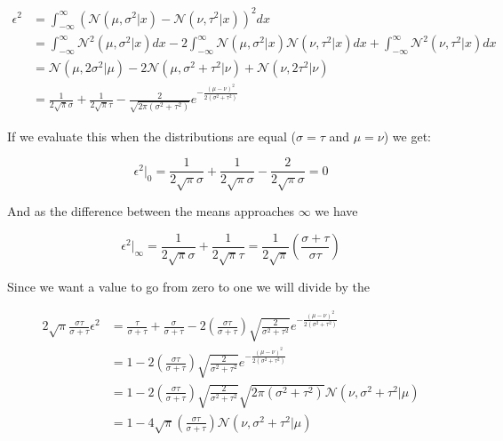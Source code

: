 \documentclass{article}
\begin{document}
\begin{equation}
\begin{aligned}
    \epsilon^2 & =\int_{-\infty}^\infty \left( \mathcal{N}(\mu, \sigma^2|x) - \mathcal{N}(\nu, \tau^2|x) \right)^2 dx \\
    &=\int_{-\infty}^\infty \mathcal{N}^2(\mu, \sigma^2|x)dx -2\int_{-\infty}^\infty \mathcal{N}(\mu, \sigma^2|x)\mathcal{N}(\nu, \tau^2|x)dx + \int_{-\infty}^\infty \mathcal{N}^2(\nu, \tau^2|x) dx \\
    &=\mathcal{N}(\mu,2\sigma^2|\mu)-2\mathcal{N}(\mu,\sigma^2+\tau^2|\nu)+\mathcal{N}(\nu,2\tau^2|\nu) \\
    &=\frac{1}{2\sqrt{\pi}\sigma}+\frac{1}{2\sqrt{\pi}\tau}-\frac{2}{\sqrt{2\pi\left( \sigma^2+\tau^2 \right)}}e^{-\frac{(\mu-\nu)^2}{2(\sigma^2+\tau^2)}}
\end{aligned}
\end{equation}

If we evaluate this when the distributions are equal ($\sigma = \tau$ and $\mu=\nu$) we get:

\begin{equation}
    \epsilon^2|_0 = \frac{1}{2\sqrt{\pi}\sigma} + \frac{1}{2\sqrt{\pi}\sigma} - \frac{2}{2\sqrt{\pi}\sigma} = 0
\end{equation}

And as the difference between the means approaches $\infty$ we have

\begin{equation}
    \epsilon^2|_\infty = \frac{1}{2\sqrt{\pi}\sigma} + \frac{1}{2\sqrt{\pi}\tau} = \frac{1}{2\sqrt{\pi}}\left(\frac{\sigma+\tau}{\sigma\tau} \right)
\end{equation}

Since we want a value to go from zero to one we will divide by the

\begin{equation}
\begin{aligned}
    2\sqrt{\pi}\frac{\sigma\tau}{\sigma + \tau}\epsilon^2 &= \frac{\tau}{\sigma + \tau} + \frac{\sigma}{\sigma + \tau} - 2\left( \frac{\sigma\tau}{\sigma + \tau}\right)\sqrt{\frac{2}{\sigma^2+\tau^2}}e^{-\frac{(\mu-\nu)^2}{2(\sigma^2+\tau^2)}} \\
    &= 1 - 2\left( \frac{\sigma\tau}{\sigma + \tau}\right)\sqrt{\frac{2}{\sigma^2+\tau^2}}e^{-\frac{(\mu-\nu)^2}{2(\sigma^2+\tau^2)}} \\
    &= 1 - 2\left( \frac{\sigma\tau}{\sigma + \tau}\right) \sqrt{\frac{2}{\sigma^2+\tau^2}}\sqrt{2\pi\left( \sigma^2+\tau^2 \right)} \mathcal{N}\left(\nu, \sigma^2+\tau^2|\mu \right) \\
    &= 1 - 4\sqrt{\pi}\left( \frac{\sigma\tau}{\sigma + \tau}\right) \mathcal{N}\left(\nu, \sigma^2+\tau^2|\mu \right) \\
\end{aligned}
\end{equation}
\end{document}

